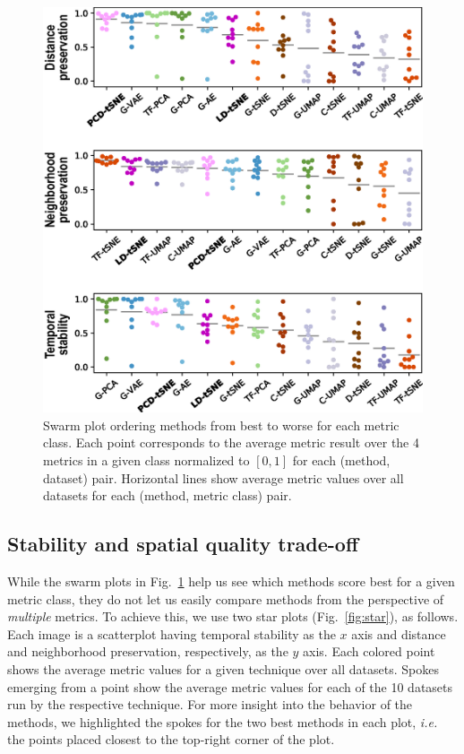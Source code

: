 \begin{figure}[htb!]\centering
 \includegraphics[width=0.92\linewidth]{figures/projection-algorithm/swarm.eps}
 \vspace{-0.25cm}
 \caption{
  Swarm plot ordering methods from best to worse for each metric class.
  Each point corresponds to the average metric result over the 4 metrics in a given class normalized to $[0,1]$ for each (method, dataset) pair.
  Horizontal lines show average metric values over all datasets for each (method, metric class) pair.
 }
 \vspace{-0.25cm}
 \label{fig:swarm}
\end{figure}

\subsection{Stability and spatial quality trade-off}
\label{sec:starplot}
%
While the swarm plots in Fig.~\ref{fig:swarm} help us see which methods score best for a given metric class, they do not let us easily compare methods from the perspective of \emph{multiple} metrics. To achieve this, we use two star plots (Fig.~\ref{fig:star}), as follows. Each image is a scatterplot having temporal stability as the $x$ axis and distance and neighborhood preservation, respectively, as the $y$ axis. Each colored point shows the average metric values for a given technique over all datasets. Spokes emerging from a point show the average metric values for each of the 10 datasets run by the respective technique. For more insight into the behavior of the methods, we highlighted the spokes for the two best methods in each plot, \emph{i.e.} the points placed closest to the top-right corner of the plot. 

